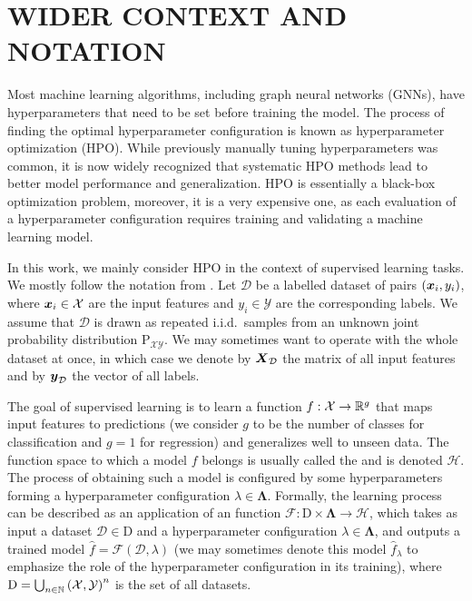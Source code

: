 \section{\uppercase{Wider context and Notation}}
\label{sec:context}

Most machine learning algorithms, including graph neural networks (GNNs), have hyperparameters that need to be set before training the model. The process of finding the optimal hyperparameter configuration is known as hyperparameter optimization (HPO). While previously manually tuning hyperparameters was common, it is now widely recognized that systematic HPO methods lead to better model performance and generalization. HPO is essentially a black-box optimization problem, moreover, it is a very expensive one, as each evaluation of a hyperparameter configuration requires training and validating a machine learning model.

In this work, we mainly consider HPO in the context of supervised learning tasks. We mostly follow the notation from \cite{bischl_hyperparameter_2023}. Let \( \mathcal{D} \) be a labelled dataset of pairs \( \left( \boldsymbol{x}_i, y_i \right) \), where \( \boldsymbol{x}_i \in \mathcal{X} \) are the input features and \( y_i \in \mathcal{Y} \) are the corresponding labels. We assume that \( \mathcal{D} \) is drawn as repeated i.i.d.\ samples from an unknown joint probability distribution \( \mathrm{P}_{\mathcal{X}\mathcal{Y}} \). We may sometimes want to operate with the whole dataset at once, in which case we denote by \( \boldsymbol{X}_\mathcal{D} \) the matrix of all input features and by \( \boldsymbol{y}_\mathcal{D} \) the vector of all labels.

The goal of supervised learning is to learn a function \( f: \mathcal{X} \to \mathbb{R}^g \) that maps input features to predictions (we consider \( g \) to be the number of classes for classification and \( g = 1 \) for regression) and generalizes well to unseen data. The function space to which a model \( f \) belongs is usually called the  and is denoted \( \mathscr{H} \). The process of obtaining such a model is configured by some hyperparameters forming a hyperparameter configuration \( \lambda \in \boldsymbol\Lambda \). Formally, the learning process can be described as an application of an  function \( \mathscr{F} : \mathrm{D} \times \boldsymbol\Lambda \to \mathscr{H} \), which takes as input a dataset \( \mathcal{D} \in \mathrm{D} \) and a hyperparameter configuration \( \lambda \in \boldsymbol\Lambda \), and outputs a trained model \( \hat{f} = \mathscr{F} ( \mathcal{D}, \lambda ) \) (we may sometimes denote this model \( \hat{f}_\lambda \) to emphasize the role of the hyperparameter configuration in its training), where \( \mathrm{D} = \bigcup_{n \in \mathbb{N}} \left( \mathcal{X}, \mathcal{Y} \right)^n \) is the set of all datasets.

